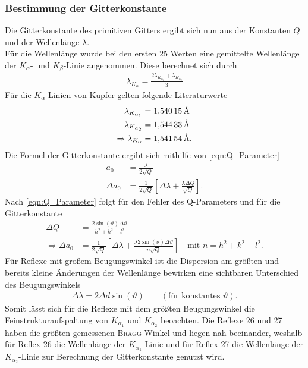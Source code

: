 \documentclass[a4paper,twoside,final]{article}
\begin{document}
\subsubsection{Bestimmung der Gitterkonstante}
Die Gitterkonstante des primitiven Gitters ergibt sich nun aus der Konstanten $Q$ und der Wellenlänge $\lambda$.\\
Für die Wellenlänge wurde bei den ersten 25 Werten eine gemittelte Wellenlänge der $K_\alpha$- und $K_\beta$-Linie angenommen. Diese berechnet sich durch
\begin{align}
  \lambda_{K_\alpha} = \frac{2\lambda_{K_{\alpha_1}}+\lambda_{K_{\alpha_2}}}{3}
\end{align}
Für die $K_\alpha$-Linien von Kupfer gelten folgende Literaturwerte
\begin{align}
  \lambda_{K_{\alpha_1}} &= \SI{1,54015}{\textup{\AA}}\nonumber\\
  \lambda_{K_{\alpha_2}} &= \SI{1,54433}{\textup{\AA}}\label{eqn:Wellenlänge}\\
\Rightarrow \lambda_{K_\alpha} &= \SI{1,54154}{\textup{\AA}}.\nonumber
\end{align}
Die Formel der Gitterkonstante ergibt sich mithilfe von \eqref{eqn:Q_Parameter}
\begin{align}
  a_0 &= \frac{\lambda}{2 \sqrt{Q}}\\
  \Delta a_0 &= \frac{1}{2\sqrt{Q}} \left[\Delta \lambda + \frac{\lambda \Delta Q}{\sqrt{Q}}\right].
\end{align}
Nach \eqref{eqn:Q_Parameter} folgt für den Fehler des Q-Parameters und für die Gitterkonstante
\begin{align}
  \Delta Q &= \frac{2 \sin(\vartheta)\Delta \vartheta}{h^2+k^2+l^2}\\
  \Rightarrow \Delta a_0 &= \frac{1}{2\sqrt{Q}} \left[\Delta \lambda + \frac{\lambda 2 \sin(\vartheta)\Delta \vartheta}{n\sqrt{Q}}\right] \quad \text{mit }n = h^2+k^2+l^2.
\end{align}
Für Reflexe mit großem Beugungswinkel ist die Dispersion am größten und bereits kleine Änderungen der Wellenlänge bewirken eine sichtbaren Unterschied des Beugungswinkels
\begin{align}
  \Delta \lambda = 2 \Delta d \sin(\vartheta) \qquad (\text{für konstantes }\vartheta).
\end{align}
Somit lässt sich für die Reflexe mit dem größten Beugungswinkel die Feinstrukturaufspaltung von $K_{\alpha_1}$ und $K_{\alpha_2}$ beoachten. Die Reflexe 26 und 27 haben die größten gemessenen \textsc{Bragg}-Winkel und liegen nah beeinander, weshalb für Reflex 26 die Wellenlänge der $K_{\alpha_1}$-Linie und für Reflex 27 die Wellenlänge der $K_{\alpha_2}$-Linie zur Berechnung der Gitterkonstante genutzt wird.
\end{document}
